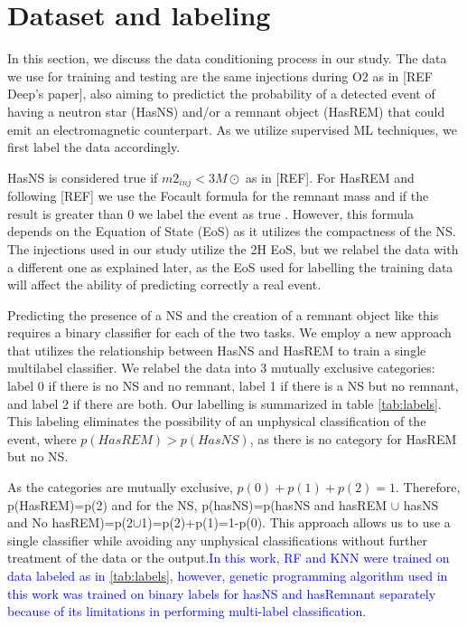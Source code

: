 \section{Dataset and labeling\label{dataset}}
\label{sec:dataset}
In this section, we discuss the data conditioning process in our study. The data we use for training and testing are the same injections during O2 as in  [REF Deep's paper], also aiming to predictict the probability of a detected event of having a neutron star (HasNS) and/or a remnant object (HasREM) that could emit an electromagnetic counterpart. As we utilize supervised ML techniques, we first label the data accordingly.

HasNS is considered true if $m2_{inj}< 3M\odot$ as in [REF]. For HasREM and following [REF] we use the Focault formula for the remnant mass and if the result is greater than 0 we label the event as true . However, this formula depends on the Equation of State (EoS) as it utilizes the compactness of the NS. The injections used in our study utilize the 2H EoS, but we relabel the data with a different one as explained later, as the EoS used for labelling the training data will affect the ability of predicting correctly a real event.

Predicting the presence of a NS and the creation of a remnant object like this requires a binary classifier for each of the two tasks. We employ a new approach that utilizes the relationship between HasNS and HasREM to train a single multilabel classifier. We relabel the data into 3 mutually exclusive categories: label 0 if there is no NS and no remnant, label 1 if there is a NS but no remnant, and label 2 if there are both. Our labelling is summarized in table \ref{tab:labels}. This labeling eliminates the possibility of an unphysical classification of the event, where $p(HasREM)>p(HasNS)$, as there is no category for HasREM but no NS.

As the categories are mutually exclusive, $p(0)+p(1)+p(2)=1$. Therefore, p(HasREM)=p(2) and for the NS, p(hasNS)=p(hasNS and hasREM $\cup$ hasNS and No hasREM)=p(2$\cup$1)=p(2)+p(1)=1-p(0). This approach allows us to use a single classifier while avoiding any unphysical classifications without further treatment of the data or the output.\textcolor{blue}{In this work, RF and KNN were trained on data labeled as in \ref{tab:labels}, however, genetic programming algorithm used in this work was trained on binary labels for hasNS and hasRemnant separately because of its limitations in performing multi-label classification}.

